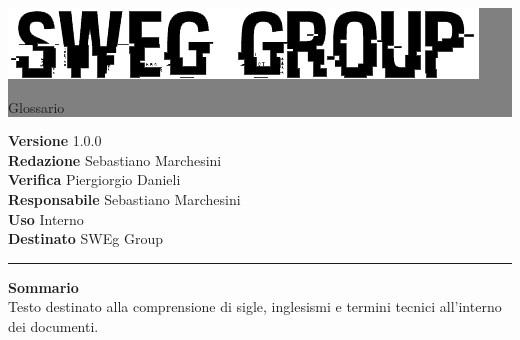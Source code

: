 \documentclass[12pt,a4paper,titlepage]{article}
\newcommand{\HRule}[1]{\hfill \rule{0.2\linewidth}{#1}} %
\begin{document}
	
	\thispagestyle{empty} %
	
	
	\colorbox{grey}{
		\parbox[t]{1.0\linewidth}{
			\centering \fontsize{50pt}{80pt}\selectfont %
			\vspace*{0.7cm} %
		
				\raggedleft
				\includegraphics[width=0.7\linewidth]{../../LogoSWEgGroupSFONDOVUOTO}
			
			\hfill Glossario \\
			
			\vspace*{0.7cm} %
		}
	}
	
	
	\vfill %
	
	
	{\centering \large 
		\hfill \textbf{Versione} 1.0.0 \\
		\hfill \textbf{Redazione} Sebastiano Marchesini \\
		\hfill \textbf{Verifica} Piergiorgio Danieli \\
		\hfill \textbf{Responsabile} Sebastiano Marchesini \\
		\hfill \textbf{Uso} Interno \\
		\hfill \textbf{Destinato} SWEg Group \\ 
		
		\HRule{1pt}
	
	\textbf{Sommario} \\
	Testo destinato alla comprensione di sigle, inglesismi e termini tecnici all'interno dei documenti.

	} %
\end{document}
